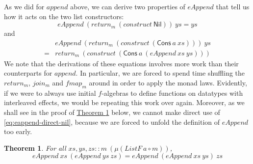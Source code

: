 \documentclass{jfp1}
\newtheorem{theorem}{Theorem}
\newcommand{\thmref}[1]{\hyperref[#1]{Theorem \ref*{#1}}}
\begin{document}
As we did for $\mathit{append}$ above, we can derive two properties of
$\mathit{eAppend}$ that tell us how it acts on the two list
constructors:
\begin{equation}
  \label{eq:eappend-direct-nil}
  \mathit{eAppend}~(\mathit{return}_m~(\mathit{construct}~\mathsf{Nil}))~\mathit{ys} = \mathit{ys}
\end{equation}
and
\begin{equation}\label{eq:eappend-direct-cons}
  \begin{array}{cl}
    & \mathit{eAppend}~(\mathit{return}_m~(\mathit{construct}~(\mathsf{Cons}~a~\mathit{xs})))~\mathit{ys} \\ 
    =&\mathit{return}_m~(\mathit{construct}~(\mathsf{Cons}~a~(\mathit{eAppend}~\mathit{xs}~\mathit{ys})))
  \end{array}
\end{equation}
We note that the derivations of these equations involves more work
than their counterparts for $\mathit{append}$. In particular, we are
forced to spend time shuffling the $\mathit{return_m}$,
$\mathit{join_m}$ and $\mathit{fmap_m}$ around in order to apply the
monad laws. Evidently, if we were to always use initial $f$-algebras
to define functions on datatypes with interleaved effects, we would be
repeating this work over again. Moreover, as we shall see in the proof
of \thmref{thm:direct-eappend-assoc} below, we cannot make direct use
of \autoref{eq:eappend-direct-nil}, because we are forced to unfold
the definition of $\mathit{eAppend}$ too early.

\begin{theorem}\label{thm:direct-eappend-assoc}
  For all $\mathit{xs}, \mathit{ys}, \mathit{zs} :: m~(\mu (\mathit{ListF}~a \circ m))$,
  \begin{displaymath}
    \mathit{eAppend}~\mathit{xs}~(\mathit{eAppend}~\mathit{ys}~\mathit{zs}) = \mathit{eAppend}~(\mathit{eAppend}~\mathit{xs}~\mathit{ys})~\mathit{zs}
  \end{displaymath}
\end{theorem}
\end{document}
